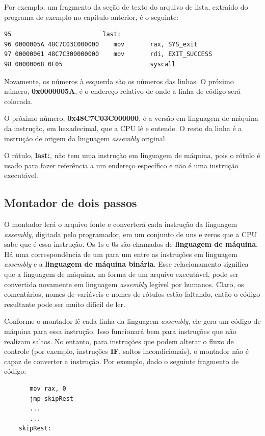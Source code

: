 Por exemplo, um fragmento da seção de texto do arquivo de lista, extraído do programa de exemplo no capítulo anterior, é o seguinte:

\begin{verbatim}
95                         last:
96 0000005A 48C7C03C000000	  mov		rax, SYS_exit
97 00000061 48C7C300000000	  mov		rdi, EXIT_SUCCESS	
98 00000068 0F05			            syscall
\end{verbatim}

Novamente, os números à esquerda são os números das linhas. O próximo número, \textbf{0x0000005A}, é o endereço relativo de onde a linha de código será colocada.

O próximo número, \textbf{0x48C7C03C000000}, é a versão em linguagem de máquina da instrução, em hexadecimal, que a CPU lê e entende. O resto da linha é a instrução de origem da linguagem \textit{assembly} original.

O rótulo, \textbf{last:}, não tem uma instrução em linguagem de máquina, pois o rótulo é usado para fazer referência a um endereço específico e não é uma instrução executável.

\subsection{Montador de dois passos}
O montador lerá o arquivo fonte e converterá cada instrução da linguagem \textit{assembly}, digitada pelo programador, em um conjunto de uns e zeros que a CPU sabe que é essa instrução. Os 1s e 0s são chamados de \textbf{linguagem de máquina}. Há uma correspondência de um para um entre as instruções em linguagem \textit{assembly} e a \textbf{linguagem de máquina binária}. Esse relacionamento significa que a linguagem de máquina, na forma de um arquivo executável, pode ser convertida novamente em linguagem \textit{assembly} legível por humanos. Claro, os comentários, nomes de variáveis e nomes de rótulos estão faltando, então o código resultante pode ser muito difícil de ler.

Conforme o montador lê cada linha da linguagem \textit{assembly}, ele gera um código de máquina para essa instrução. Isso funcionará bem para instruções que não realizam saltos. No entanto, para instruções que podem alterar o fluxo de controle (por exemplo, instruções \textbf{IF}, saltos incondicionais), o montador não é capaz de converter a instrução. Por exemplo, dado o seguinte fragmento de código:

\begin{verbatim}
       mov rax, 0
       jmp skipRest
       ...
       ...
    skipRest:
\end{verbatim}

